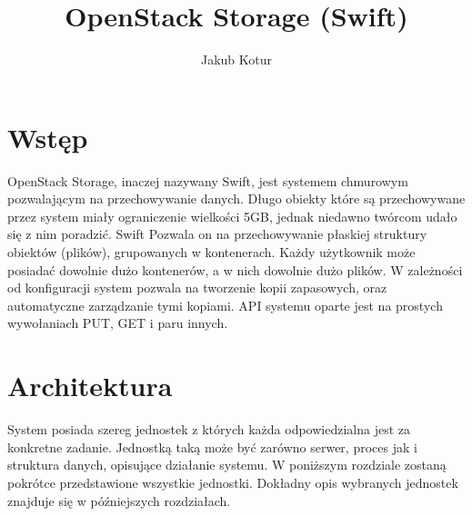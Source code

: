 


\title{OpenStack Storage (Swift)}
\author{Jakub Kotur}



\maketitle

\section{Wstęp}

\nocite{openstack}

OpenStack Storage, inaczej nazywany Swift, jest systemem chmurowym pozwalającym na przechowywanie danych. Długo obiekty które są przechowywane przez system miały ograniczenie wielkości 5GB, jednak niedawno twórcom udało się z nim poradzić. Swift Pozwala on na przechowywanie płaskiej struktury obiektów (plików), grupowanych w kontenerach. Każdy użytkownik może posiadać dowolnie dużo kontenerów, a w nich dowolnie dużo plików. W zależności od konfiguracji system pozwala na tworzenie kopii zapasowych, oraz automatyczne zarządzanie tymi kopiami. API systemu oparte jest na prostych wywołaniach PUT, GET i paru innych.



\section{Architektura}\label{sec:architektura}

System posiada szereg jednostek z których każda odpowiedzialna jest za konkretne zadanie. Jednostką taką może być zarówno serwer, proces jak i struktura danych, opisujące działanie systemu. W poniższym rozdziale zostaną pokrótce przedstawione wszystkie jednostki. Dokładny opis wybranych jednostek znajduje się w późniejszych rozdziałach.

